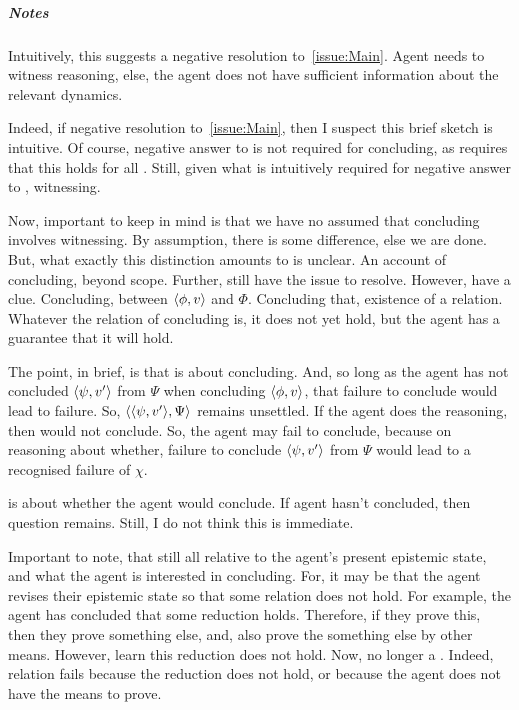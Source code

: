 \subparagraph*{Notes}

\begin{note}[Witnessing?]
  Intuitively, this suggests a negative resolution to~\autoref{issue:Main}.
  Agent needs to witness reasoning, else, the agent does not have sufficient information about the relevant dynamics.

  Indeed, if negative resolution to~\autoref{issue:Main}, then I suspect this brief sketch is intuitive.
  Of course, negative answer to \qzS{} is not required for concluding, as \qzS{} requires that this holds for all .
  Still, given what is intuitively required for negative answer to \qzS{}, witnessing.
\end{note}

\begin{note}
  Now, important to keep in mind is that we have no assumed that concluding involves witnessing.
  By assumption, there is some difference, else we are done.
  But, what exactly this distinction amounts to is unclear.
  An account of concluding, beyond scope.
  Further, still have the issue to resolve.
  However, have a clue.
  Concluding, between \(\langle \phi, v \rangle\) and \(\Phi\).
  Concluding that, existence of a relation.
  Whatever the relation of concluding is, it does not yet hold, but the agent has a guarantee that it will hold.
\end{note}

\begin{note}
  The point, in brief, is that \qzS{} is about concluding.
  And, so long as the agent has not concluded \(\langle \psi, v' \rangle\) from \(\Psi\) when concluding \(\langle \phi, v \rangle\), that failure to conclude would lead to failure.
  So, \(\langle \langle \psi, v' \rangle, \Psi \rangle\) remains unsettled.
  If the agent does the reasoning, then would not conclude.
  So, the agent may fail to conclude, because on reasoning about whether, failure to conclude \(\langle \psi, v' \rangle\) from \(\Psi\) would lead to a recognised failure of \(\chi\).

  \qzS{} is about whether the agent would conclude.
  If agent hasn't concluded, then question remains.
  Still, I do not think this is immediate.
\end{note}


\begin{note}
  Important to note, that still all relative to the agent's present epistemic state, and what the agent is interested in concluding.
  For, it may be that the agent revises their epistemic state so that some relation does not hold.
  For example, the agent has concluded that some reduction holds.
  Therefore, if they prove this, then they prove something else, and, also prove the something else by other means.
  However, learn this reduction does not hold.
  Now, no longer a \requ{}.
  Indeed, relation fails because the reduction does not hold, or because the agent does not have the means to prove.
\end{note}

